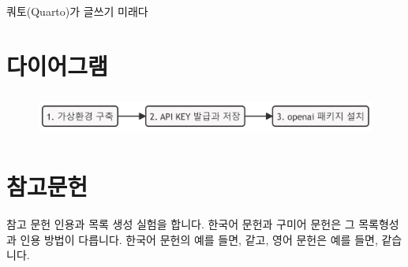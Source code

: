 \documentclass[
  letterpaper,
  DIV=11,
  numbers=noendperiod]{scrartcl}
\begin{document}
쿼토(Quarto)가 글쓰기 미래다

\normalsize

\hypertarget{uxb2e4uxc774uxc5b4uxadf8uxb7a8}{%
\section{다이어그램}\label{uxb2e4uxc774uxc5b4uxadf8uxb7a8}}

\begin{figure}[H]

{\centering \includegraphics[width=6.25in,height=0.54in]{hello_quarto_files/figure-latex/mermaid-figure-1.png}

}

\end{figure}

\hypertarget{uxcc38uxace0uxbb38uxd5cc}{%
\section{참고문헌}\label{uxcc38uxace0uxbb38uxd5cc}}

참고 문헌 인용과 목록 생성 실험을
합니다. 한국어 문헌과
구미어 문헌은 그 목록형성과 인용 방법이 다릅니다. 한국어 문헌의 예를
들면, \autocite{kimuycwung_hankwukphan_2003}\과 같고, 영어 문헌은 예를
들면, \autocite{Allport:1992:OND}\과 같습니다.


\printbibliography[title=문헌목록]
\end{document}
